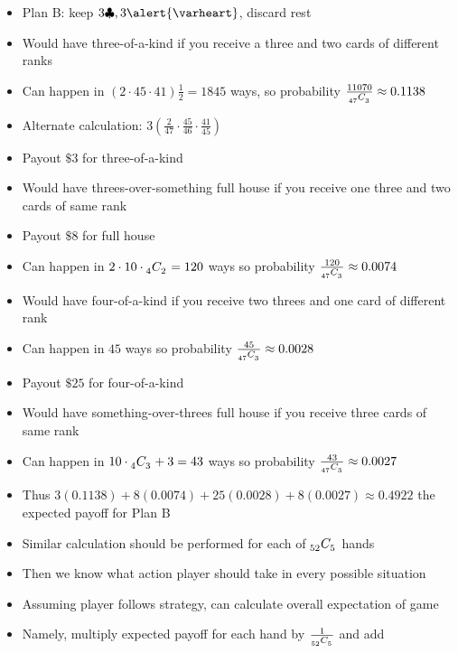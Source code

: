 \documentclass[handout,xcolor=dvipsnames]{beamer}
\theoremstyle{definition}
\newcommand\ncr[2]{\tensor[_{#1}]C{_{#2}}}
\newcommand{\hs}{\alert{\varheart}}
\newcommand{\cs}{\clubsuit}
\begin{document}
\begin{frame}
\begin{itemize}
\item Plan B: keep $3\cs,3\hs$, discard rest
\item Would have three-of-a-kind if you receive
a three and two cards of different ranks
\item Can happen in $\left(2\cdot 45\cdot 41\right)\frac{1}{2}
=1845$ ways,
so probability $\frac{11070}{\ncr{47}{3}}\approx 0.1138$
\item Alternate calculation:
$3\left(\frac{2}{47}\cdot\frac{45}{46}
\cdot\frac{41}{45}\right)$
\item Payout $\$3$ for three-of-a-kind
\item Would have threes-over-something full house if
you receive one three and two cards of same rank
\item Payout $\$8$ for full house
\item Can happen in $2\cdot 10\cdot\ncr{4}{2}=120$ ways
so probability $\frac{120}{\ncr{47}{3}}\approx 0.0074$
\end{itemize}
\end{frame}

\begin{frame}
\begin{itemize}
\item Would have four-of-a-kind if you receive
two threes and one card of different rank
\item Can happen in $45$ ways
so probability $\frac{45}{\ncr{47}{3}}\approx 0.0028$
\item Payout $\$25$ for four-of-a-kind
\item Would have something-over-threes full house
if you receive three cards of same rank
\item Can happen in $10\cdot\ncr{4}{3}+3=43$ ways
so probability $\frac{43}{\ncr{47}{3}}\approx 0.0027$
\item Thus $3\left(0.1138\right)+8\left(0.0074\right)
+25\left(0.0028\right)+8\left(0.0027\right)
\approx 0.4922$ the expected payoff for Plan B
\end{itemize}
\end{frame}


\begin{frame}
\begin{itemize}
\item Similar calculation should be performed for each
of $\ncr{52}{5}$ hands
\item Then we know what action player should take in
every possible situation
\item Assuming player follows strategy, can calculate
overall expectation of game
\item Namely, multiply expected payoff for each hand by
$\frac{1}{\ncr{52}{5}}$ and add
\end{itemize}
\end{frame}
\end{document}
